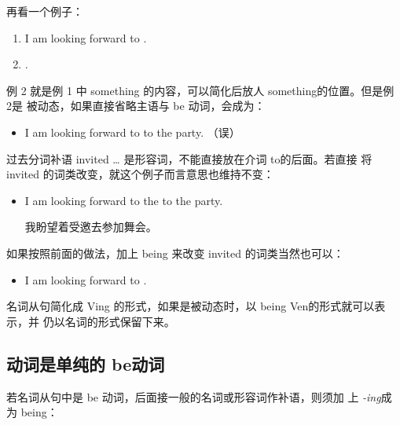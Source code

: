 再看一个例子：
\begin{enumerate}
\item I am looking forward to .
\item {}.
\end{enumerate}
例 2 就是例 1 中 something 的内容，可以简化后放人 something的位置。但是例 2是
被动态，如果直接省略主语与 be 动词，会成为：
\begin{itemize}
\item I am looking forward to  to the party. （误）
\end{itemize}
过去分词补语 invited \ldots{} 是形容词，不能直接放在介词 to的后面。若直接
将 invited 的词类改变，就这个例子而言意思也维持不变：
\begin{itemize}
\item I am looking forward to the  to the party.

  我盼望着受邀去参加舞会。
\end{itemize}

如果按照前面的做法，加上 being 来改变 invited 的词类当然也可以：
\begin{itemize}
\item I am looking forward to .
\end{itemize}

名词从句简化成 Ving 的形式，如果是被动态时，以 being Ven的形式就可以表示，并
仍以名词的形式保留下来。

\subsection{动词是单纯的 be动词}

若名词从句中是 be 动词，后面接一般的名词或形容词作补语，则须加
上 \emph{-ing}成为 being：

